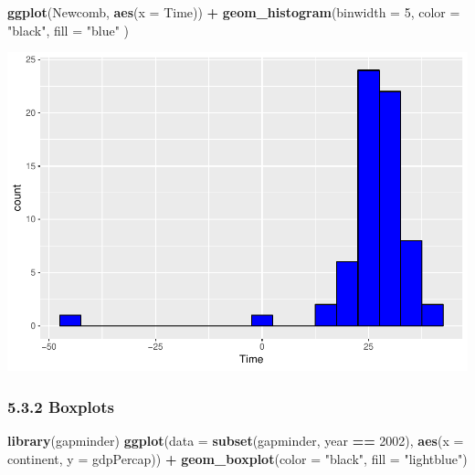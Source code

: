 \documentclass[]{article}
\newenvironment{Shaded}{\begin{snugshade}}{\end{snugshade}}
\newcommand{\KeywordTok}[1]{\textcolor[rgb]{0.13,0.29,0.53}{\textbf{#1}}}
\newcommand{\DataTypeTok}[1]{\textcolor[rgb]{0.13,0.29,0.53}{#1}}
\newcommand{\DecValTok}[1]{\textcolor[rgb]{0.00,0.00,0.81}{#1}}
\newcommand{\StringTok}[1]{\textcolor[rgb]{0.31,0.60,0.02}{#1}}
\newcommand{\OperatorTok}[1]{\textcolor[rgb]{0.81,0.36,0.00}{\textbf{#1}}}
\newcommand{\NormalTok}[1]{#1}
\begin{document}
\begin{Shaded}
\begin{Highlighting}[]
\KeywordTok{ggplot}\NormalTok{(Newcomb, }\KeywordTok{aes}\NormalTok{(}\DataTypeTok{x =}\NormalTok{ Time)) }\OperatorTok{+}
\KeywordTok{geom_histogram}\NormalTok{(}\DataTypeTok{binwidth =} \DecValTok{5}\NormalTok{, }\DataTypeTok{color =} \StringTok{"black"}\NormalTok{, }\DataTypeTok{fill =} \StringTok{"blue"}\NormalTok{ )}
\end{Highlighting}
\end{Shaded}

\includegraphics{stt-301-programming_files/figure-latex/unnamed-chunk-68-1.pdf}

\subsubsection{5.3.2 Boxplots}\label{boxplots}

\begin{Shaded}
\begin{Highlighting}[]
\KeywordTok{library}\NormalTok{(gapminder)}
\KeywordTok{ggplot}\NormalTok{(}\DataTypeTok{data =} \KeywordTok{subset}\NormalTok{(gapminder, year }\OperatorTok{==}\StringTok{ }\DecValTok{2002}\NormalTok{),}
     \KeywordTok{aes}\NormalTok{(}\DataTypeTok{x =}\NormalTok{ continent, }\DataTypeTok{y =}\NormalTok{ gdpPercap)) }\OperatorTok{+}
\StringTok{  }\KeywordTok{geom_boxplot}\NormalTok{(}\DataTypeTok{color =} \StringTok{"black"}\NormalTok{, }\DataTypeTok{fill =} \StringTok{"lightblue"}\NormalTok{)}
\end{Highlighting}
\end{Shaded}
\end{document}
